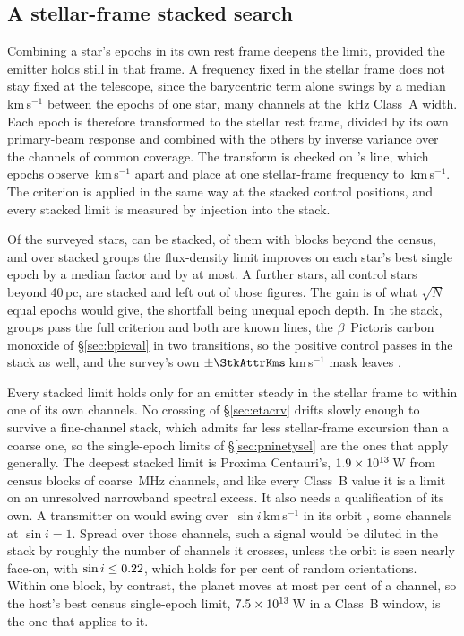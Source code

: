 \subsection{A stellar-frame stacked search}
\label{sec:stack}

Combining a star's epochs in its own rest frame deepens the limit, provided
the emitter holds still in that frame. A frequency fixed in the stellar
frame does not stay fixed at the telescope, since the barycentric term
alone swings by a median \StkVcorrSwingMed\,km\,s$^{-1}$ between the epochs
of one star, many channels at the \StkRefChanKHz\,kHz Class~A width. Each
epoch is therefore
transformed to the stellar rest frame, divided by its own primary-beam
response and combined with the others by inverse variance over the channels
of common coverage. The transform is checked on \StkPersistLineStar's line,
which \StkRegNEpoch{} epochs observe \StkRegTopoKms\,km\,s$^{-1}$ apart and
place at one stellar-frame frequency to \FrEpochStelKms\,km\,s$^{-1}$. The
criterion is applied in the same way at the stacked control positions, and
every stacked limit is measured by injection into the stack.

Of the surveyed stars, \SxStkStarCensus{} can be stacked, \SttNStkOneEb{} of
them with blocks beyond the census, and over \SyStkNGroup{} stacked groups
the flux-density limit improves on each star's best single epoch by a median
factor \SyStkGainMed{} and by \SyStkGainMax{} at most. A further
\SxStkStarOutside{} stars, all control stars beyond 40\,pc, are stacked and left
out of those figures. The gain is \StkGainVsN{} of what $\sqrt{N}$ equal
epochs would give, the shortfall being unequal epoch depth.
In the stack, \StkNSurvive{} groups pass the full criterion and both are
known lines, the $\beta$~Pictoris carbon monoxide of \S\ref{sec:bpicval} in two
transitions, so the positive control passes in the stack as well, and the
survey's own $\pm\StkAttrKms$\,km\,s$^{-1}$ mask leaves \StkUnattrClause.

Every stacked limit holds only for an emitter steady in the stellar frame to
within one of its own channels. No crossing of \S\ref{sec:etacrv} drifts
slowly enough to survive a fine-channel stack, which admits far less
stellar-frame excursion than a coarse one, so the single-epoch limits of
\S\ref{sec:pninetysel} are the ones that apply generally. The deepest
stacked limit is Proxima Centauri's, $1.9\times10^{13}$\,W from
\SxProxEbCensus{} census blocks of coarse \ChanBModeMHz\,MHz channels, and
like every Class~B value it is a limit on an unresolved narrowband spectral
excess. It also needs a qualification of its own. A transmitter on
\PxPlanet{} would swing over \PxPPKms\,$\sin i$\,km\,s$^{-1}$ in its orbit
\citep{AngladaEscude2016,Kervella2017,NEA2013}, some \PxNChanWalk{} channels
at $\sin i=1$. Spread over those channels, such a signal would be diluted
in the stack by roughly the number of channels it crosses, unless the orbit
is seen nearly face-on, with $\sin i\le0.22$, which holds for
\PxIsoPct{} per cent of random orientations. Within one block, by contrast, the planet moves at most
\PxBlockPct{} per cent of a channel, so the host's best census single-epoch
limit, $7.5\times10^{13}$\,W in a Class~B window, is the one that applies to it.
